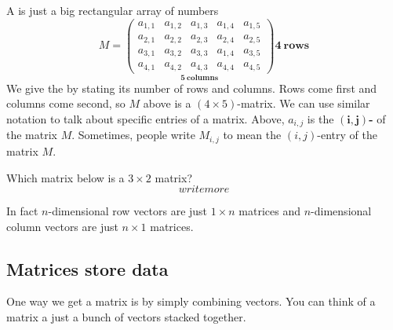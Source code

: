 \documentclass{ximera}
\begin{document}
A  is just a big rectangular array of numbers
\[
M =
\underset{\displaystyle\boldsymbol{5}~\textbf{columns}}{\begin{pmatrix}
  a_{1,1} & a_{1,2} & a_{1,3} & a_{1,4} & a_{1,5} \\
  a_{2,1} & a_{2,2} & a_{2,3} & a_{2,4} & a_{2,5} \\
  a_{3,1} & a_{3,2} & a_{3,3} & a_{1,4} & a_{3,5} \\
  a_{4,1} & a_{4,2} & a_{4,3} & a_{4,4} & a_{4,5}
\end{pmatrix}}
\boldsymbol{4}~\textbf {rows}
\]
We give the  by stating its number of rows
and columns. Rows come first and columns come second, so $M$ above is
a $(4\times 5)$-matrix. We can use similar notation to talk about
specific entries of a matrix. Above, $a_{i,j}$ is the
$\boldsymbol{(i,j)}${\bf-} of the matrix $M$. Sometimes,
people write $M_{i,j}$ to mean the $(i,j)$-entry of the matrix $M$.

\begin{question}
  Which matrix below is a $3\times 2$ matrix?
  \[
  write more
  \]
\end{question}
In fact $n$-dimensional row vectors are just $1\times n$ matrices and
$n$-dimensional column vectors are just $n\times 1$ matrices.


\subsection{Matrices store data}


One way we get a matrix is by simply combining vectors. You can think
of a matrix a just a bunch of vectors stacked together.
\end{document}
